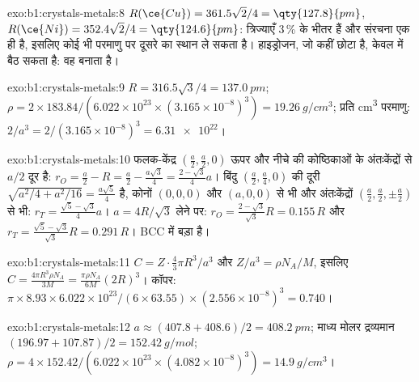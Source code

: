 \begin{solution}{exo:b1:crystals-metals:8}
$R(\ce{Cu}) = 361.5\sqrt2/4 = \qty{127.8}{pm}$, $R(\ce{Ni}) = 352.4\sqrt2/4
= \qty{124.6}{pm}$: त्रिज्याएँ 3\,\% के भीतर हैं और संरचना एक ही है, इसलिए कोई भी
परमाणु  पर दूसरे का स्थान ले सकता है। हाइड्रोजन, जो कहीं छोटा है,
केवल  में बैठ सकता है: वह  बनाता है।
\end{solution}

\begin{solution}{exo:b1:crystals-metals:9}
$R = 316.5\sqrt3/4 = \qty{137.0}{pm}$; $\rho = 2 \times 183.84/(6.022 \times
10^{23} \times (3.165 \times 10^{-8})^3) = \qty{19.26}{g/cm^3}$; प्रति
\unit{cm^3} परमाणु: $2/a^3 = 2/(3.165 \times 10^{-8})^3 = \num{6.31e22}$।
\end{solution}

\begin{solution}{exo:b1:crystals-metals:10}
फलक-केंद्र $(\frac a2,\frac a2,0)$ ऊपर और नीचे की कोष्ठिकाओं के अंतःकेंद्रों से
$a/2$ दूर है: $r_O = \frac a2 - R = \frac a2 - \frac{a\sqrt3}{4}
= \frac{2-\sqrt3}{4}a$। बिंदु $(\frac a2,\frac a4,0)$ की दूरी
$\sqrt{a^2/4 + a^2/16} = \frac{a\sqrt5}{4}$ है, कोनों $(0,0,0)$ और
$(a,0,0)$ से भी और अंतःकेंद्रों $(\frac a2,\frac a2,\pm\frac a2)$ से भी:
$r_T = \frac{\sqrt5 - \sqrt3}{4}a$। $a = 4R/\sqrt3$ लेने पर:
$r_O = \frac{2-\sqrt3}{\sqrt3}R = 0.155\,R$ और
$r_T = \frac{\sqrt5-\sqrt3}{\sqrt3}R = 0.291\,R$। BCC में 
बड़ा है।
\end{solution}

\begin{solution}{exo:b1:crystals-metals:11}
$C = Z\cdot\frac43\pi R^3/a^3$ और $Z/a^3 = \rho N_A/M$, इसलिए $C =
\frac{4\pi R^3\rho N_A}{3M} = \frac{\pi\rho N_A}{6M}(2R)^3$। कॉपर:
$\pi \times 8.93 \times 6.022 \times 10^{23}/(6 \times 63.55) \times (2.556
\times 10^{-8})^3 = 0.740$।
\end{solution}

\begin{solution}{exo:b1:crystals-metals:12}
$a \approx (407.8 + 408.6)/2 = \qty{408.2}{pm}$; माध्य मोलर द्रव्यमान $(196.97 +
107.87)/2 = \qty{152.42}{g/mol}$; $\rho = 4 \times 152.42/(6.022 \times
10^{23} \times (4.082 \times 10^{-8})^3) = \qty{14.9}{g/cm^3}$।
\end{solution}

